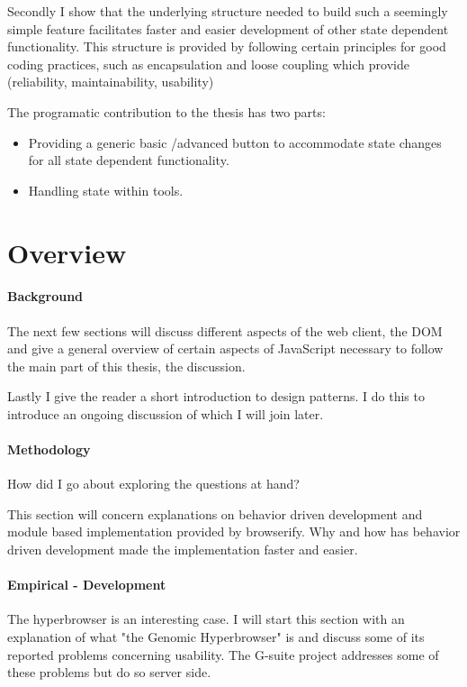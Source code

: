 \documentclass[english]{ifimaster}
\begin{document}
Secondly I show that the underlying structure needed to build such a seemingly simple feature facilitates faster and easier development of other state dependent functionality. This structure is provided by following certain principles for good coding practices, such as encapsulation and loose coupling which provide (reliability, maintainability, usability)

The programatic contribution to the thesis has two parts:
\begin{itemize}
  \item Providing a generic basic /advanced button to accommodate state changes for all state dependent functionality.
  \item Handling state within tools. 
\end{itemize}

\section{Overview}
\paragraph{Background}


The next few sections will discuss different aspects of the web client, the DOM and give a general overview of certain aspects of JavaScript necessary to follow the main part of this thesis, the discussion. 

Lastly I give the reader a short introduction to design patterns. I do this to introduce an ongoing discussion of which I will join later.

\paragraph{Methodology}
How did I go about exploring the questions at hand?


This section will concern explanations on behavior driven development and module based implementation provided by browserify. Why and how has behavior driven development made the implementation faster and easier.
\paragraph{Empirical - Development}
The hyperbrowser is an interesting case.
I will start this section with an explanation of what "the Genomic Hyperbrowser" is and discuss some of its reported problems concerning usability. The G-suite project addresses some of these problems but do so server side. 
\end{document}
